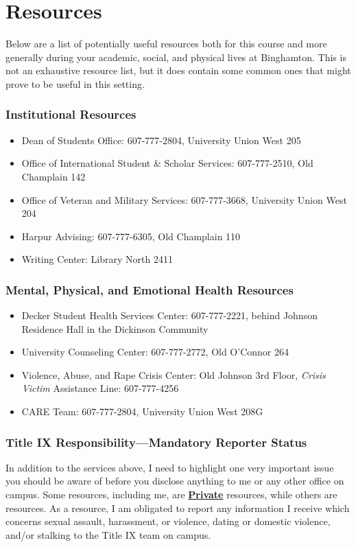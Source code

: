 \documentclass[12pt]{article}
\begin{document}
\section*{Resources}
\par{Below are a list of potentially useful resources both for this course and more generally during your academic, social, and physical lives at Binghamton. This is not an exhaustive resource list, but it does contain some common ones that might prove to be useful in this setting.}

\subsubsection*{Institutional Resources}
\begin{itemize}
\item Dean of Students Office: 607-777-2804, University Union West 205
\item Office of International Student \& Scholar Services: 607-777-2510, Old Champlain 142
\item Office of Veteran and Military Services: 607-777-3668, University Union West 204 
\item Harpur Advising: 607-777-6305, Old Champlain 110
\item Writing Center: Library North 2411
\end{itemize}

\subsubsection*{Mental, Physical, and Emotional Health Resources}
\begin{itemize}
\item Decker Student Health Services Center: 607-777-2221, behind Johnson Residence Hall in the Dickinson Community
\item University Counseling Center: 607-777-2772, Old O'Connor 264
\item Violence, Abuse, and Rape Crisis Center: Old Johnson 3rd Floor, \textit{Crisis Victim} Assistance Line: 607-777-4256
\item CARE Team: 607-777-2804, University Union West 208G
\end{itemize}

\subsubsection*{Title IX Responsibility---Mandatory Reporter Status}
\par{In addition to the services above, I need to highlight one very important issue you should be aware of before you disclose anything to me or any other office on campus. Some resources, including me, are \href{https://www.binghamton.edu/services/title-ix/about/index.html#:~:text=A%20PRIVATE%20person%2Foffice%20is,to%20the%20greatest%20extent%20possible}{\textbf{Private}} resources, while others are \textbf{\color{AccentGreen}{Confidential}} resources. As a \textbf{\color{BingGreen}{Private}} resource, I am obligated to report any information I receive which concerns sexual assault, harassment, or violence, dating or domestic violence, and/or stalking to the Title IX team on campus.}
\end{document}
